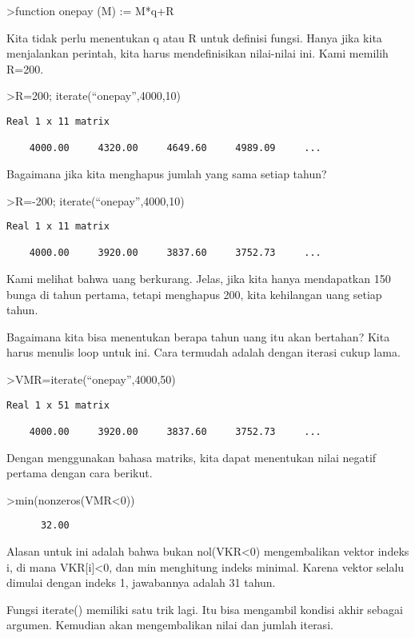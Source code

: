\documentclass[
]{book}
\begin{document}
\textgreater function onepay (M) := M*q+R

Kita tidak perlu menentukan q atau R untuk definisi fungsi. Hanya jika kita menjalankan perintah, kita harus mendefinisikan nilai-nilai ini. Kami memilih R=200.

\textgreater R=200; iterate(``onepay'',4000,10)

\begin{verbatim}
Real 1 x 11 matrix

    4000.00     4320.00     4649.60     4989.09     ...
\end{verbatim}

Bagaimana jika kita menghapus jumlah yang sama setiap tahun?

\textgreater R=-200; iterate(``onepay'',4000,10)

\begin{verbatim}
Real 1 x 11 matrix

    4000.00     3920.00     3837.60     3752.73     ...
\end{verbatim}

Kami melihat bahwa uang berkurang. Jelas, jika kita hanya mendapatkan 150 bunga di tahun pertama, tetapi menghapus 200, kita kehilangan uang setiap tahun.

Bagaimana kita bisa menentukan berapa tahun uang itu akan bertahan? Kita harus menulis loop untuk ini. Cara termudah adalah dengan iterasi cukup lama.

\textgreater VMR=iterate(``onepay'',4000,50)

\begin{verbatim}
Real 1 x 51 matrix

    4000.00     3920.00     3837.60     3752.73     ...
\end{verbatim}

Dengan menggunakan bahasa matriks, kita dapat menentukan nilai negatif pertama dengan cara berikut.

\textgreater min(nonzeros(VMR\textless0))

\begin{verbatim}
      32.00 
\end{verbatim}

Alasan untuk ini adalah bahwa bukan nol(VKR\textless0) mengembalikan vektor indeks i, di mana VKR{[}i{]}\textless0, dan min menghitung indeks minimal. Karena vektor selalu dimulai dengan indeks 1, jawabannya adalah 31 tahun.

Fungsi iterate() memiliki satu trik lagi. Itu bisa mengambil kondisi akhir sebagai argumen. Kemudian akan mengembalikan nilai dan jumlah iterasi.
\end{document}
